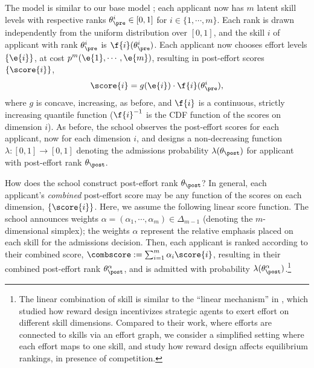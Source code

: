 \documentclass[10pt]{article}
\begin{document}
\begin{ReviewVerbatim}
 The model is similar to our base model ; each applicant now has $m$ latent skill levels with respective ranks $\theta_\pre^i \in [0,1]$ for $i\in \{1, \cdots, m\}$. Each rank is drawn independently from the uniform distribution over $[0,1]$, and the skill $i$ of applicant with rank $\theta_\pre^i$ is $\f{i}(\theta_\pre^i)$. Each applicant now chooses effort levels $\{ \e{i} \}$, at cost $p^m( \e{1}, \cdots, \e{m})$, resulting in post-effort scores $\{\score{i}\}$,
\begin{equation*}
\score{i} = g(\e{i})\cdot \f{i}(\theta_\pre^i),
\end{equation*}
where $g$ is concave, increasing, as before, and $\f{i}$ is a continuous, strictly increasing quantile function (${\f{i}}^{-1}$ is the CDF function of the scores on dimension $i$). As before, the school observes the post-effort scores for each applicant, now for each dimension $i$, and designs a non-decreasing function $\lambda : [0,1] \to [0,1]$ denoting the admissions probability $\lambda(\theta_\post)$ for applicant with post-effort rank $\theta_\post$.


How does the school construct post-effort rank $\theta_\post$? In general, each applicant's \textit{combined} post-effort score may be any function of the scores on each dimension, $\{\score{i}\}$. Here, we assume the following linear score function. The school announces weights $\alpha = (\alpha_1, \cdots, \alpha_m) \in \Delta_{m-1}$ (denoting the $m$-dimensional simplex); the weights $\alpha$ represent the relative emphasis placed on each skill for the admissions decision. Then, each applicant is ranked according to their combined score, $\combscore := \sum_{i=1}^m \alpha_i\score{i}$, resulting in their combined post-effort rank $\theta_\post^\alpha$, and is admitted with probability $\lambda(\theta_\post^\alpha)$.\footnote{The linear combination of skill is similar to the ``linear mechanism'' in \citet{kleinberg18investeffort}, which studied how reward design incentivizes strategic agents to exert effort on different skill dimensions. Compared to their work, where efforts are connected to skills via an effort graph, we consider a simplified setting where each effort maps to one skill, and study how reward design affects equilibrium rankings, in presence of competition.}



\end{ReviewVerbatim}
\end{document}
